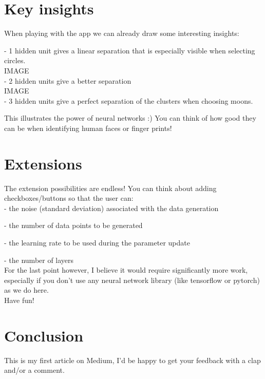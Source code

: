\section{Key insights}

When playing with the app we can already draw some interesting insights:

- 1 hidden unit gives a linear separation that is especially visible when selecting circles. \\

IMAGE \\

- 2 hidden units give a better separation \\

IMAGE \\

- 3 hidden units give a perfect separation of the clusters when choosing moons.

This illustrates the power of neural networks :) You can think of how good they can be when identifying human faces or finger prints!

\section{Extensions}

The extension possibilities are endless! You can think about adding checkboxes/buttons so that the user can: \\

- the noise (standard deviation) associated with the data generation

- the number of data points to be generated

- the learning rate to be used during the parameter update

- the number of layers \\

For the last point however, I believe it would require significantly more work, especially if you don't use any neural network library (like tensorflow or pytorch) as we do here. \\

Have fun!

\section{Conclusion}

This is my first article on Medium, I'd be happy to get your feedback with a clap and/or a comment. \\